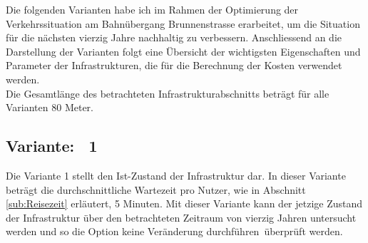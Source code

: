 %
%
%
%


Die folgenden Varianten habe ich im Rahmen der Optimierung der Verkehrssituation am Bahnübergang Brunnenstrasse erarbeitet, um die Situation für die nächsten vierzig Jahre nachhaltig zu verbessern. Anschliessend an die Darstellung der Varianten folgt eine Übersicht der wichtigsten Eigenschaften und Parameter der Infrastrukturen, die für die Berechnung der Kosten verwendet werden. \\
Die Gesamtlänge des betrachteten Infrastrukturabschnitts beträgt für alle Varianten 80 Meter.


\subsection{Variante: \ 1}
\label{subsec:V1}
	
Die Variante 1 stellt den Ist-Zustand der Infrastruktur dar. In dieser Variante beträgt die durchschnittliche Wartezeit pro Nutzer, wie in Abschnitt \ref{sub:Reisezeit} erläutert, 5 Minuten.  Mit dieser Variante kann der jetzige Zustand der Infrastruktur über den betrachteten Zeitraum von vierzig Jahren untersucht werden und so die Option \flqq keine Veränderung durchführen\frqq \, überprüft werden. 


